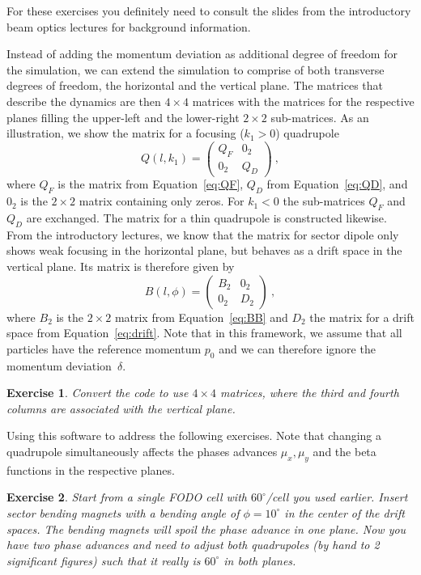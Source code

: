 \documentclass{article}
\newtheorem{exercise}{Exercise}
\begin{document}
For these exercises you definitely need to consult the slides from the introductory
beam optics lectures for background information.
\par
Instead of adding the momentum deviation as additional degree of freedom for the 
simulation, we can extend the simulation to comprise of both transverse degrees
of freedom, the horizontal and the vertical plane. The matrices that describe
the dynamics are then $4\times4$ matrices with the matrices for the respective
planes filling the upper-left and the lower-right $2\times 2$ sub-matrices. As 
an illustration, we show the matrix for a focusing ($k_1>0$) quadrupole
\begin{equation}
Q(l,k_1)=\left(\begin{array}{cc} Q_F & 0_2 \\ 0_2 & Q_D \end{array}\right)\ ,
\end{equation} 
where $Q_F$ is the matrix from Equation~\ref{eq:QF}, $Q_D$ from Equation~\ref{eq:QD},
and $0_2$ is the $2\times2$ matrix containing only zeros. For $k_1<0$ the sub-matrices
$Q_F$ and $Q_D$ are exchanged. The matrix for a thin quadrupole is constructed likewise.
From the introductory lectures, we know that the matrix for sector dipole only shows
weak focusing in the horizontal plane, but behaves as a drift space in the vertical 
plane. Its matrix is therefore given by
\begin{equation}
B(l,\phi)= \left(\begin{array}{cc} B_2 & 0_2 \\ 0_2 & D_2 \end{array}\right)\ ,
\end{equation}
where $B_2$ is the $2\times 2$ matrix from Equation~\ref{eq:BB} and $D_2$ the matrix
for  a drift space from Equation~\ref{eq:drift}. Note that in this framework, we
assume that all particles have the reference momentum $p_0$ and we can therefore
ignore the momentum deviation~$\delta.$
\begin{exercise}
Convert the code to use $4\times4$ matrices, where the 
  third and fourth columns are associated with the vertical plane.  
\end{exercise}

Using this software to address the following exercises. Note that changing a quadrupole 
simultaneously affects the phases advances $\mu_x, \mu_y$ and the beta functions
in the respective planes.
\begin{exercise}
Start from a single FODO cell with $60^\circ$/cell you used 
  earlier. Insert sector bending magnets with a bending angle of $\phi=10^\circ$ in the 
  center of the drift spaces. The bending magnets will spoil the phase advance in 
  one plane. Now you have two phase advances and need to adjust both quadrupoles 
  (by hand to 2 significant figures) such that it really is $60^\circ$ in both planes. 
\end{exercise}  
\end{document}
